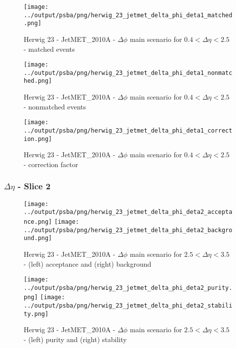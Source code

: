 \documentclass[11pt]{book}
\begin{document}
\begin{figure}[ht]
\centering
\texttt{[image: ../output/psba/png/herwig\_23\_jetmet\_delta\_phi\_deta1\_matched.png]}
\caption{Herwig 23 - JetMET\_2010A - $\Delta\phi$ main scenario for $0.4 < \Delta\eta < 2.5$ - matched events}
\label{fig:hw_23_jetmet_delta_phi_deta1_matched}
\end{figure}

\begin{figure}[ht]
\centering
\texttt{[image: ../output/psba/png/herwig\_23\_jetmet\_delta\_phi\_deta1\_nonmatched.png]}
\caption{Herwig 23 - JetMET\_2010A - $\Delta\phi$ main scenario for $0.4 < \Delta\eta < 2.5$ - nonmatched events}
\label{fig:hw_23_jetmet_delta_phi_deta1_nonmatched}
\end{figure}

\begin{figure}[ht]
\centering
\texttt{[image: ../output/psba/png/herwig\_23\_jetmet\_delta\_phi\_deta1\_correction.png]}
\caption{Herwig 23 - JetMET\_2010A - $\Delta\phi$ main scenario for $0.4 < \Delta\eta < 2.5$ - correction factor}
\label{fig:hw_23_jetmet_delta_phi_deta1_correction}
\end{figure}


\clearpage
\subsubsection{$\Delta\eta$ - Slice 2}

\begin{figure}[ht]
\centering
\texttt{[image: ../output/psba/png/herwig\_23\_jetmet\_delta\_phi\_deta2\_acceptance.png]}
\texttt{[image: ../output/psba/png/herwig\_23\_jetmet\_delta\_phi\_deta2\_background.png]}
\caption{Herwig 23 - JetMET\_2010A - $\Delta\phi$ main scenario for $2.5 < \Delta\eta < 3.5$ - (left) acceptance and (right) background}
\label{fig:hw_23_jetmet_delta_phi_deta2_ab}
\end{figure}

\begin{figure}[ht]
\centering
\texttt{[image: ../output/psba/png/herwig\_23\_jetmet\_delta\_phi\_deta2\_purity.png]}
\texttt{[image: ../output/psba/png/herwig\_23\_jetmet\_delta\_phi\_deta2\_stability.png]}
\caption{Herwig 23 - JetMET\_2010A - $\Delta\phi$ main scenario for $2.5 < \Delta\eta < 3.5$ - (left) purity and (right) stability}
\label{fig:hw_23_jetmet_delta_phi_deta2_ps}
\end{figure}
\end{document}
